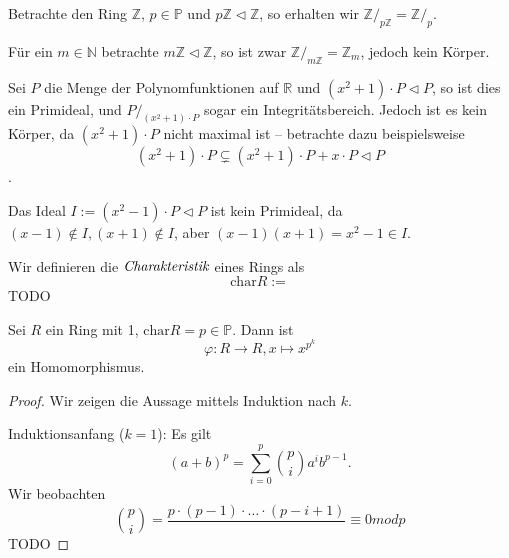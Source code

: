 
\begin{example}
    Betrachte den Ring $\mathbb{Z}$, $p \in \mathbb{P}$ und $p \mathbb{Z} \vartriangleleft \mathbb{Z}$, so erhalten wir $\mathbb{Z}/_{p\mathbb{Z}} = \mathbb{Z}/_p$.

    Für ein $m \in \mathbb{N}$ betrachte $m \mathbb{Z} \vartriangleleft \mathbb{Z}$, so ist zwar $\mathbb{Z} /_{m\mathbb{Z}} = \mathbb{Z}_m$, jedoch kein Körper.
\end{example}

\begin{example}
    Sei $P$ die Menge der Polynomfunktionen auf $\mathbb{R}$ und $(x^2+1) \cdot P \vartriangleleft P$, so ist dies ein Primideal, und $P/_{(x^2+1) \cdot P}$ sogar ein Integritätsbereich. Jedoch ist es kein Körper, da $(x^2+1) \cdot P$ nicht maximal ist -- betrachte dazu beispielsweise
    $$ (x^2 + 1) \cdot P \subsetneq (x^2+1) \cdot P + x \cdot P \vartriangleleft P $$.

    Das Ideal $I := (x^2 - 1) \cdot P \vartriangleleft P$ ist kein Primideal, da $(x-1)\notin I, (x+1) \notin I$, aber $(x-1)(x+1) = x^2 - 1 \in I$.
\end{example}

\begin{definition}
    Wir definieren die $\emph{Charakteristik}$ eines Rings als
    $$ \mathrm{char}{R} := $$
    TODO
\end{definition}

\begin{proposition}
    Sei $R$ ein Ring mit 1, $\mathrm{char} R = p \in \mathbb{P}$. Dann ist
    $$ \varphi : R \to R, x \mapsto x^{p^k} $$
    ein Homomorphismus.
\end{proposition}

\begin{proof}
    Wir zeigen die Aussage mittels Induktion nach $k$.

    Induktionsanfang ($k = 1$): Es gilt
    $$ (a+b)^p = \sum_{i=0}^p {p \choose i} a^i b^{p-1}. $$
    Wir beobachten
    $$ {p \choose i} = \frac{p \cdot (p-1) \cdot \hdots \cdot (p-i+1)}{} \equiv 0 mod p $$
    TODO
\end{proof}

